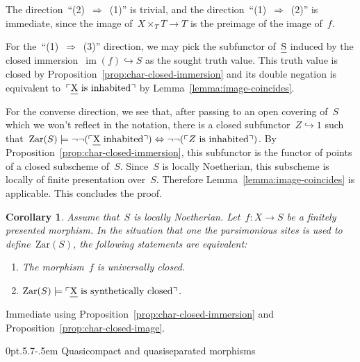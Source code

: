\documentclass[10pt,reqno,a4paper]{amsbook}
\makeatletter
\theoremstyle{definition}
\theoremstyle{plain}
\newtheorem{cor}[defn]{Corollary}
\theoremstyle{remark}
\let\oldul\ul
\renewcommand{\ul}[1]{\text{\oldul{$#1$}}}
\newcommand{\Zar}{\mathrm{Zar}}
\DeclareMathOperator{\im}{im}
\newcommand{\?}{\,{:}\,}
\renewcommand{\_}{\mathpunct{.}\,}
\newcommand{\speak}[1]{\ulcorner\text{\textnormal{#1}}\urcorner}
\renewenvironment{proof}[1][\proofname]{\par
  \pushQED{\qed}%
  \normalfont \topsep6\p@\@plus6\p@\relax
  \trivlist
  \item[\hskip\labelsep
        \itshape
    #1\@addpunct{.}]\ignorespaces
}{%
  \popQED\endtrivlist\@endpefalse
}
\def\subsection{\@startsection{subsection}{2}%
  {0pt}{.5\linespacing\@plus.7\linespacing}{-.5em}%
  {\normalfont\bfseries}}
\makeatother
\begin{document}
\begin{proof}The direction~``(2)~$\Rightarrow$~(1)'' is trivial, and the
direction~``(1)~$\Rightarrow$~(2)'' is immediate, since the image of~$X
\times_T T \to T$ is the preimage of the image of~$f$.

For the~``(1)~$\Rightarrow$~(3)'' direction, we may pick the subfunctor
of~$\ul{S}$ induced by the closed immersion~$\im(f) \hookrightarrow S$ as the
sought truth value. This truth value is closed by
Proposition~\ref{prop:char-closed-immersion} and its double negation is
equivalent to~$\speak{$\ul{X}$ is inhabited}$ by
Lemma~\ref{lemma:image-coincides}.

For the converse direction, we see that, after passing to an open covering
of~$S$ which we won't reflect in the notation, there is a closed subfunctor~$Z
\hookrightarrow 1$ such that~$\Zar(S) \models \neg\neg(\speak{$\ul{X}$
inhabited}) \Leftrightarrow \neg\neg(\speak{$Z$ is inhabited})$. By
Proposition~\ref{prop:char-closed-immersion}, this subfunctor is the functor of
points of a closed subscheme of~$S$. Since~$S$ is locally Noetherian, this
subscheme is locally of finite presentation over~$S$. Therefore
Lemma~\ref{lemma:image-coincides} is applicable. This concludes the proof.
\end{proof}

\begin{cor}Assume that~$S$ is locally Noetherian. Let~$f : X \to S$ be a
finitely presented morphism. In the situation that one the parsimonious
sites is used to define~$\Zar(S)$, the following statements are equivalent:
\begin{enumerate}
\item The morphism~$f$ is universally closed.
\item $\Zar(S) \models \speak{$\ul{X}$ is synthetically closed}$.
\end{enumerate}
\end{cor}

\begin{proof}Immediate using Proposition~\ref{prop:char-closed-immersion} and
Proposition~\ref{prop:char-closed-image}.
\end{proof}


\subsection{Quasicompact and quasiseparated morphisms}
\end{document}
